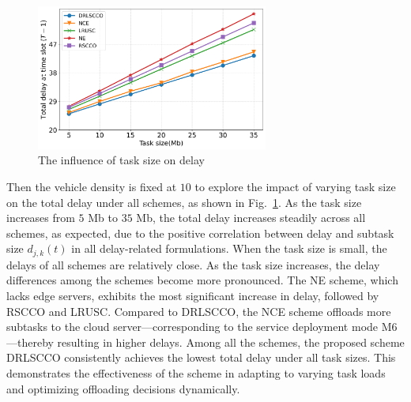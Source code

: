 \documentclass[lettersize,journal]{IEEEtran}
\begin{document}
\begin{figure}
	\centering
	\includegraphics[width=3in]{task_size_delay.png}
	\caption{The influence of task size on delay}
	\label{fig: task size v delay}
\end{figure}
Then the vehicle density is fixed at $ 10 $ to explore the impact of varying task size on the total delay under all schemes, as shown in Fig.~\ref{fig: task size v delay}. 
% 
As the task size increases from $ 5 $ Mb to $ 35 $ Mb, the total delay increases steadily across all schemes, as expected, due to the positive correlation between delay and subtask size $ d_{j,k}(t) $ in all delay-related formulations.
% 
When the task size is small, the delays of all schemes are relatively close. As the task size increases, the delay differences among the schemes become more pronounced. The NE scheme, which lacks edge servers, exhibits the most significant increase in delay, followed by RSCCO and LRUSC. Compared to DRLSCCO, the NCE scheme offloads more subtasks to the cloud server—corresponding to the service deployment mode M6—thereby resulting in higher delays.
% 
Among all the schemes, the proposed scheme DRLSCCO  consistently achieves the lowest total delay under all task sizes. This demonstrates the effectiveness of the scheme in adapting to varying task loads and optimizing offloading decisions dynamically.
\end{document}
